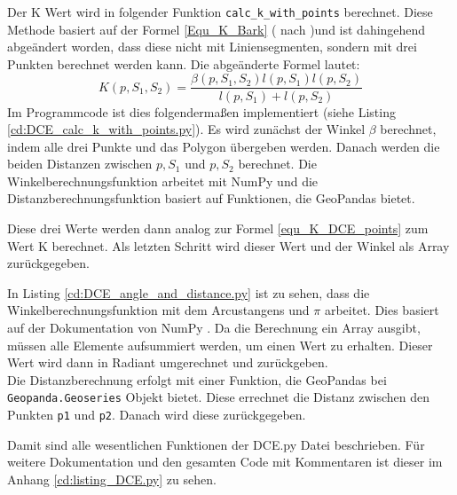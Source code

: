 {	Der K Wert wird in folgender Funktion \lstinline|calc_k_with_points| berechnet. Diese Methode basiert auf der Formel \ref{Equ_K_Bark} ( nach \citet{Latecki1999a})und ist dahingehend abgeändert worden, dass diese nicht mit Liniensegmenten, sondern mit drei Punkten berechnet werden kann. Die abgeänderte Formel lautet:
	\begin{equation}
		K(p,S_1,S_2) = \frac{\beta(p, S_1, S_2)l(p, S_1)l(p, S_2)}{l(p, S_1) + l(p, S_2)} 
		\label{equ_K_DCE_points}
	\end{equation}
	Im Programmcode ist dies folgendermaßen implementiert (siehe Listing \ref{cd:DCE_calc_k_with_points.py}). Es wird zunächst der Winkel $\beta$ berechnet, indem alle drei Punkte und das Polygon übergeben werden. Danach werden die beiden Distanzen zwischen $p, S_1$ und $p, S_2$ berechnet. Die Winkelberechnungsfunktion arbeitet mit NumPy und die Distanzberechnungsfunktion basiert auf Funktionen, die GeoPandas bietet.
	
	Diese drei Werte werden dann analog zur Formel \ref{equ_K_DCE_points} zum Wert K berechnet. Als letzten Schritt wird dieser Wert und der Winkel als Array zurückgegeben.
	
	In Listing \ref{cd:DCE_angle_and_distance.py} ist zu sehen, dass die Winkelberechnungsfunktion mit dem Arcustangens und $\pi$ arbeitet. Dies basiert auf der Dokumentation von NumPy \citep{numpy_angle}. Da die Berechnung ein Array ausgibt, müssen alle Elemente aufsummiert werden, um einen Wert zu erhalten. Dieser Wert wird dann in Radiant umgerechnet und zurückgeben. \\
	Die Distanzberechnung erfolgt mit einer Funktion, die GeoPandas bei \lstinline|Geopanda.Geoseries| Objekt bietet. Diese errechnet die Distanz zwischen den Punkten \lstinline|p1| und \lstinline|p2|. Danach wird diese zurückgegeben.
	
	Damit sind alle wesentlichen Funktionen der DCE.py Datei beschrieben. Für weitere Dokumentation und den gesamten Code mit Kommentaren ist dieser im Anhang \ref{cd:listing_DCE.py} zu sehen.
}


